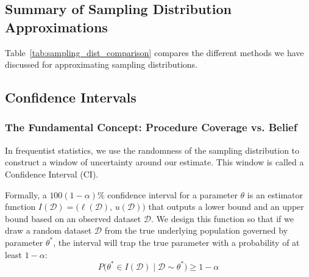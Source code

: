 \documentclass{article}
\begin{document}
\subsection{Summary of Sampling Distribution Approximations}
Table~\ref{tab:sampling_dist_comparison} compares the different methods we have discussed for approximating sampling distributions.

\begin{table}[htbp]
\centering
\small
\renewcommand{\arraystretch}{1.4}
\caption{Comparison of Frequentist Sampling Distribution Approximations}
\label{tab:sampling_dist_comparison}
\end{table}

\subsection{Confidence Intervals}

\subsubsection{The Fundamental Concept: Procedure Coverage vs. Belief}
In frequentist statistics, we use the randomness of the sampling distribution to construct a window of uncertainty around our estimate. This window is called a Confidence Interval (CI). 

Formally, a $100(1 - \alpha)\%$ confidence interval for a parameter $\theta$ is an estimator function $I(\mathcal{D}) = \big(\ell(\mathcal{D}), \, u(\mathcal{D})\big)$ that outputs a lower bound and an upper bound based on an observed dataset $\mathcal{D}$. We design this function so that if we draw a random dataset $\mathcal{D}$ from the true underlying population governed by parameter $\theta^*$, the interval will trap the true parameter with a probability of at least $1 - \alpha$:
\begin{equation}
P\Big(\theta^* \in I(\mathcal{D}) \;\Big|\; \mathcal{D} \sim \theta^*\Big) \ge 1 - \alpha
\end{equation}
\end{document}
